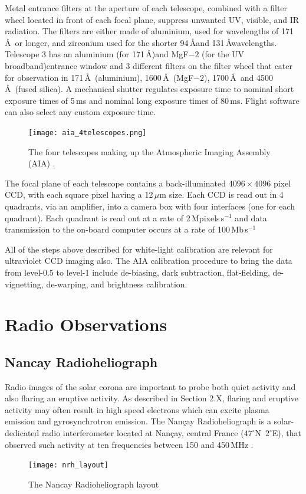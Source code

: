 Metal entrance filters at the aperture of each telescope, combined with a filter wheel located in front of each focal plane, suppress unwanted UV, visible, and IR radiation. The filters are either made of aluminium, used for wavelengths of 171\,\AA~or longer, and zirconium used for the shorter 94\,\AA and 131\,\AA wavelengths. Telescope 3 has an aluminium (for 171\,\AA)and MgF$-2$ (for the UV broadband)entrance window and 3 different filters on the filter wheel that cater for observation in 171\,\AA~(aluminium), 1600\,\AA~(MgF$-2$), 1700\,\AA~and 4500\,\AA~(fused silica). A mechanical shutter regulates exposure time to nominal short exposure times of 5\,ms and nominal long exposure times of 80\,ms. Flight software can also select any custom exposure time.
\begin{figure}[!t]
\begin{center}
\texttt{[image: aia\_4telescopes.png]}
\caption[The four telescopes making up the AIA]{The four telescopes making up the Atmospheric Imaging Assembly (AIA) \citep{lemen2012}.}
\end{center}
\end{figure}
The focal plane of each telescope contains a back-illuminated $4096\times4096$ pixel CCD, with each square pixel having a 12\,$\mu$m size. Each CCD is read out in 4 quadrants, via an amplifier, into a camera box with four interfaces (one for each quadrant). Each quadrant is read out at a rate of 2\,Mpixels\,s$^{-1}$ and data transmission to the on-board computer occurs at a rate of 100\,Mb\,s$^{-1}$

All of the steps above described for white-light calibration are relevant for ultraviolet CCD imaging also. The AIA calibration procedure to bring the data from level-0.5 to level-1 include de-biasing, dark subtraction, flat-fielding, de-vignetting, de-warping, and brightness calibration.

\section{Radio Observations}\label{sec:3}

\subsection{Nancay Radioheliograph}\label{sec:33}

Radio images of the solar corona are important to probe both quiet activity and also flaring an eruptive activity. As described in Section 2.X, flaring and eruptive activity may often result in high speed electrons which can excite plasma emission and gyrosynchrotron emission. The Nan\c{c}ay Radioheliograph is a solar-dedicated radio interferometer located at Nan\c{c}ay, central France ($47^{\circ}$N~$2^{\circ}$E), that observed such activity at ten frequencies between 150 and 450\,MHz \citep{kerdraon1997}.
\begin{figure}[t!]
\begin{center}
\texttt{[image: nrh\_layout]}
\caption[The Nancay Radioheliograph layout]{The Nancay Radioheliograph layout}
\end{center}
\label{fig:eclipse}
\end{figure}

